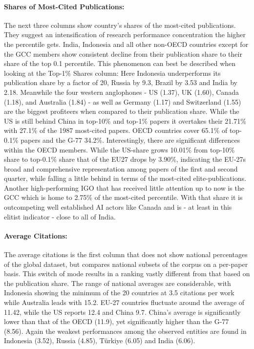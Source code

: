 \documentclass{article}
\begin{document}
	\paragraph{Shares of Most-Cited Publications:} The next three columns show country's shares of the most-cited publications. They suggest an intensification of research performance concentration the higher the percentile gets. India, Indonesia and all other non-OECD countries except for the GCC members show consistent decline from their publication share to their share of the top 0.1 percentile. This phenomenon can best be described when looking at the Top-1\% Shares column: Here Indonesia underperforms its publication share by a factor of 20, Russia by 9.3, Brazil by 3.53 and India by 2.18. Meanwhile the four western anglophones - US (1.37), UK (1.60), Canada (1.18), and Australia (1.84) - as well as Germany (1.17) and Switzerland (1.55) are the biggest profiteers when compared to their publication share. While the US is still behind China in top-10\% and top-1\% papers it overtakes their 21.71\% with 27.1\% of the 1987 most-cited papers. OECD countries cover 65.1\% of top-0.1\% papers and the G-77 34.2\%. Interestingly, there are significant differences within the OECD members. While the US-share grows 10.01\% from top-10\% share to top-0.1\% share that of the EU27 drops by 3.90\%, indicating the EU-27s broad and comprehensive representation among papers of the first and second quarter, while falling a little behind in terms of the most-cited elite-publications. Another high-performing IGO that has received little attention up to now is the GCC which is home to 2.75\% of the most-cited percentile. With that share it is outcompeting well established AI actors like Canada and is - at least in this elitist indicator - close to all of India.
	
	\paragraph{Average Citations:} The average citations is the first column that does not show national percentages of the global dataset, but compares national subsets of the corpus on a per-paper basis. This switch of mode results in a ranking vastly different from that based on the publication share. The range of national averages are considerable, with Indonesia showing the minimum of the 20 countries at 3.5 citations per work while Australia leads with 15.2. EU-27 countries fluctuate around the average of 11.42, while the US reports 12.4 and China 9.7. China's average is significantly lower than that of the OECD (11.9), yet significantly higher than the G-77 (8.56). Again the weakest performances among the observed entities are found in Indonesia (3.52), Russia (4.85), Türkiye (6.05) and India (6.06).
	
\end{document}
